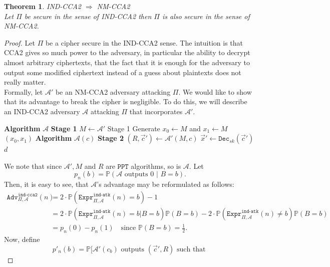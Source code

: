 \documentclass{article}
\newtheorem{theorem}{Theorem}[section]
\theoremstyle{definition}
\theoremstyle{example}
\newcommand{\Dec}{\texttt{Dec}}
\newcommand{\A}{\mathcal{A}}
\newcommand{\Prob}{\mathbb{P}}
\newcommand{\PPT}{\texttt{PPT}}
\newcommand{\Expr}[2]{\texttt{Expr}^{\texttt{#1}}_{#2}}
\newcommand{\Adv}[2]{\texttt{Adv}^{\texttt{#1}}_{#2}}
\begin{document}
\begin{theorem}{IND-CCA2 $\Rightarrow$ NM-CCA2}\\
  Let $\Pi$ be secure in the sense of IND-CCA2 then $\Pi$ is also secure in the
  sense of NM-CCA2.
\end{theorem}
\begin{proof}
  Let $\Pi$ be a cipher secure in the IND-CCA2 sense. The intuition is that CCA2
  gives so much power to the adversary, in particular the ability to decrypt
  almost arbitrary ciphertexts, that the fact that it is enough for the
  adversary to output some modified ciphertext instead of a guess about
  plaintexts does not really matter.\\
  Formally, let $\A'$ be an NM-CCA2 adversary attacking $\Pi$. We would like to
  show that its advantage to break the cipher is negligible. To do this, we will
  describe an IND-CCA2 adversary $\A$ attacking $\Pi$ that incorporates $\A'$.\\
  \begin{algorithmic}
    \State \textbf{Algorithm} $\A$ \textbf{Stage 1}
    \State $M \leftarrow \A'$ Stage 1
    \State Generate $x_0 \leftarrow M$ and $x_1 \leftarrow M$
    \State \Return $(x_0, x_1)$
    \State
    \State \textbf{Algorithm} $\A(c)$ \textbf{Stage 2}
    \State $(R, \vec{c}') \leftarrow \A'(M, c)$
    \State $\vec{x}' \leftarrow \Dec_{sk}(\vec{c}')$
     \EndIf
    \State \Return $d$
    \State
  \end{algorithmic}
  We note that since $\A', M$ and $R$ are $\PPT$ algorithms, so is $\A$. Let
  \[
    p_n(b) = \Prob(\A \text{ outputs } 0 \,\, | \,\, B = b).
  \]
  Then, it is easy to see, that $\A$'s advantage may be reformulated as follows:
  \begin{equation}
    \begin{split}
      \label{eq:indcca2eqnmcca2}
    \Adv{ind-cca2}{\Pi, \A}(n) &= 2\cdot\Prob(\Expr{ind-atk}{\Pi, \A}(n) = b)
    - 1 \\
                               &= 2\cdot\Prob(\Expr{ind-atk}{\Pi, \A}(n) = b | B = b)\Prob(B = b)
    - 2\cdot\Prob(\Expr{ind-atk}{\Pi, \A}(n) \neq b)\Prob(B = b) \\
                               &= p_n(0) - p_n(1)\quad\text{since } \Prob(B = b) = \frac12.
     \end{split}
  \end{equation}
  Now, define
  \[
    p'_n(b) = \Prob[\A'(c_b) \text{ outputs } (\vec{c}', R) \text{ such that }
\]
\end{proof}
\end{document}
